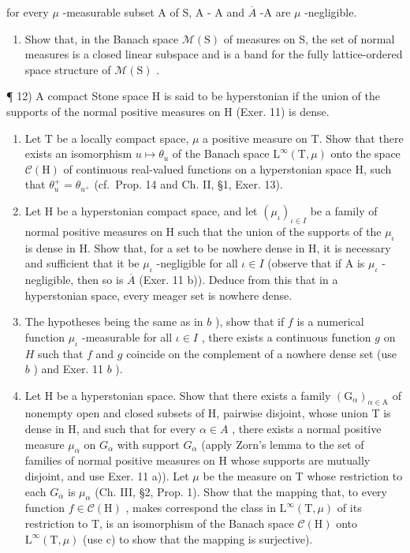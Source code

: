 for every \(\mu\) -measurable subset A of S, A - A and \(\overline{A}\) -A are \(\mu\) -negligible.

\begin{enumerate}
\def\labelenumi{\alph{enumi})}
\setcounter{enumi}{2}
\tightlist
\item
  Show that, in the Banach space \(\mathcal{M}(\mathrm{S})\) of measures on S, the set of normal measures is a closed linear subspace and is a band for the fully lattice-ordered space structure of \(\mathcal{M}(\mathrm{S})\) .
\end{enumerate}

¶ 12) A compact Stone space H is said to be hyperstonian if the union of the supports of the normal positive measures on H (Exer. 11) is dense.

\begin{enumerate}
\def\labelenumi{\alph{enumi})}
\item
  Let T be a locally compact space, \(\mu\) a positive measure on T. Show that there exists an isomorphism \(u \mapsto \theta_{u}\) of the Banach space \(\mathrm{L}^{\infty}(\mathrm{T}, \mu)\) onto the space \(\mathcal{C}(\mathrm{H})\) of continuous real-valued functions on a hyperstonian space H, such that \(\theta_{u}^{+} = \theta_{u^{+}}\) (cf.~Prop. 14 and Ch. II, §1, Exer. 13).
\item
  Let H be a hyperstonian compact space, and let \((\mu_{\iota})_{\iota\in I}\) be a family of normal positive measures on H such that the union of the supports of the \(\mu_{\iota}\) is dense in H. Show that, for a set to be nowhere dense in H, it is necessary and sufficient that it be \(\mu_{\iota}\) -negligible for all \(\iota\in I\) (observe that if A is \(\mu_{\iota}\) -negligible, then so is \(\overline{A}\) (Exer. 11 b)). Deduce from this that in a hyperstonian space, every meager set is nowhere dense.
\item
  The hypotheses being the same as in \(b\) ), show that if \(f\) is a numerical function \(\mu_{\iota}\) -measurable for all \(\iota \in I\) , there exists a continuous function \(g\) on \(H\) such that \(f\) and \(g\) coincide on the complement of a nowhere dense set (use \(b\) ) and Exer. 11 \(b\) ).
\item
  Let H be a hyperstonian space. Show that there exists a family \((\mathrm{G}_{\alpha})_{\alpha\in\mathrm{A}}\) of nonempty open and closed subsets of H, pairwise disjoint, whose union T is dense in H, and such that for every \(\alpha\in A\) , there exists a normal positive measure \(\mu_{\alpha}\) on \(G_{\alpha}\) with support \(G_{\alpha}\) (apply Zorn's lemma to the set of families of normal positive measures on H whose supports are mutually disjoint, and use Exer. 11 a)). Let \(\mu\) be the measure on T whose restriction to each \(G_{\alpha}\) is \(\mu_{\alpha}\) (Ch. III, §2, Prop. 1). Show that the mapping that, to every function \(f\in\mathcal{C}(\mathrm{H})\) , makes correspond the class in \(\mathrm{L}^{\infty}(\mathrm{T},\mu)\) of its restriction to T, is an isomorphism of the Banach space \(\mathcal{C}(\mathrm{H})\) onto \(\mathrm{L}^{\infty}(\mathrm{T},\mu)\) (use c) to show that the mapping is surjective).
\end{enumerate}

